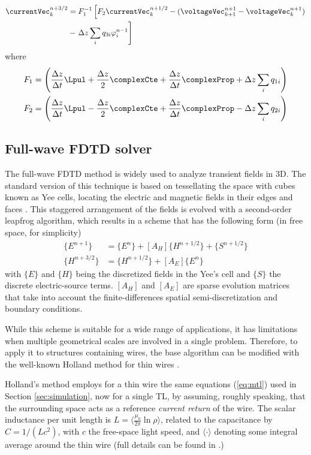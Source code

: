 \begin{align}
	\currentVec^{n+3/2}_{k} &= F_{1}^{-1}\left[F_{2}\currentVec^{n+1/2}_{k} - (\voltageVec^{n+1}_{k+1}-\voltageVec^{n+1}_{k}) \right. \nonumber \\
	&- \left. \Delta z \sum_{i}q_{3i}\varphi^{n-1}_{i}  \right]
\end{align}
where
\begin{align}
    F_{1} &= \left( \frac{\Delta z}{\Delta t}\Lpul + \frac{\Delta z}{2}\complexCte + \frac{\Delta z}{\Delta t}\complexProp + \Delta z \sum_{i}q_{1i}\right)\\
    F_{2} &= \left( \frac{\Delta z}{\Delta t}\Lpul - \frac{\Delta z}{2}\complexCte + \frac{\Delta z}{\Delta t}\complexProp - \Delta z \sum_{i}q_{2i}\right)
\end{align}

\subsection{Full-wave FDTD solver} \label{sec:full-wave-fdtd}
The full-wave FDTD method is widely used to analyze transient fields in 3D.
The standard version of this technique is based on tessellating the space with cubes known as Yee cells, locating the electric and magnetic fields in their edges and faces \cite{Yee1966}.
This staggered arrangement of the fields is evolved with a second-order leapfrog algorithm, which results in a scheme that has the following form (in free space, for simplicity)
\begin{align}
	\{E^{n+1}  \} & = \{E^n      \} + [A_{H}] \{H^{n+1/2}\}+\{S^{n+1/2}\}  \nonumber \\
	\{H^{n+3/2}\} & = \{H^{n+1/2}\} + [A_{E}] \{E^n\} \label{eq:fdtd-base-algorithm}
\end{align}
with $\{E\}$ and $\{H\}$ being the discretized fields in the Yee's cell and $\{S\}$ the discrete electric-source terms. $[A_{H}]$ and $[A_{E}]$ are sparse evolution matrices that take into account the finite-differences spatial semi-discretization and boundary conditions.

While this scheme is suitable for a wide range of applications, it has limitations when multiple geometrical scales are involved in a single problem.
Therefore, to apply it to structures containing wires, the base algorithm can be modified with the well-known Holland method for thin wires \cite{Holland1981,Schmidt2004}.

Holland's method employs for a thin wire the same equations (\ref{eq:mtl}) used in Section \ref{sec:simulation}, now for a single TL, by assuming, roughly speaking, that the surrounding space acts as a reference {\it current return} of the wire. The scalar inductance per unit length is $L=\langle\frac{\mu_0}{2\pi}\ln\rho\rangle$, related to the capacitance by $C=1/(Lc^2)$, with $c$ the free-space light speed, and $\langle\cdot\rangle$ denoting some integral average around the thin wire (full details can be found in \cite{Holland1981}.) 

